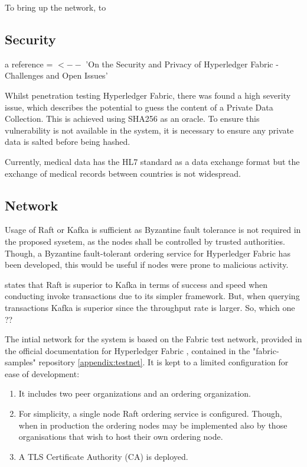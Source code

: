 To bring up the network, to 

\subsection{Security}

a reference = \cite{brotsis_security_2020} $<--$ 'On the Security and Privacy of Hyperledger Fabric - Challenges and Open Issues'

Whilst penetration testing Hyperledger Fabric, there was found a high severity issue, which describes the potential to guess the content of a Private Data Collection.
This is achieved using SHA256 as an oracle. To ensure this vulnerability is not available in the system, it is necessary to ensure any private data is salted before being hashed. \cite{shaw_penetration_2019}




Currently, medical data has the HL7 standard as a data exchange format but the
exchange of medical records between countries is not widespread. \cite{kung_personal_2020}

\subsection{Network}
Usage of Raft or Kafka is sufficient as Byzantine fault tolerance is not required in the proposed sysetem, as the nodes shall be controlled by trusted authorities.
Though, a Byzantine fault-tolerant ordering service for Hyperledger Fabric has been developed, this would be useful if nodes were prone to malicious activity. \cite{sousa_byzantine_2018}

\cite{yusuf1_comparison_2020} states that Raft is superior to Kafka in terms of success and speed when conducting invoke transactions due to its simpler framework. But, when querying transactions Kafka is superior since the throughput rate is larger.
So, which one ??

The intial network for the system is based on the Fabric test network, provided in the official documentation for Hyperledger Fabric \cite{noauthor_using_nodate}, contained in the "fabric-samples" repository \ref{appendix:testnet}.
It is kept to a limited configuration for ease of development:
\begin{enumerate}
\item{It includes two peer organizations and an ordering organization.}
\item{For simplicity, a single node Raft ordering service is configured. Though, when in production the ordering nodes may be implemented also by those organisations that wish to host their own ordering node.}
\item{A TLS Certificate Authority (CA) is deployed.}
\end{enumerate}

